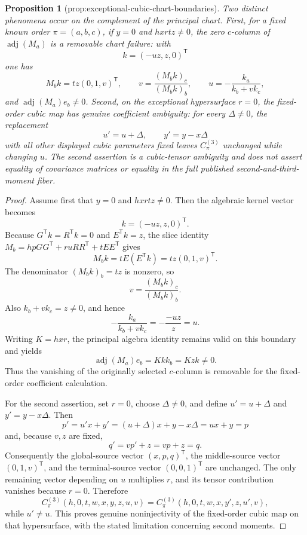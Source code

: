 \documentclass{article}
\newtheorem{proposition}{Proposition}
\begin{document}
\begin{proposition}[prop:exceptional-cubic-chart-boundaries]\label{prop:exceptional-cubic-chart-boundaries}
Two distinct phenomena occur on the complement of the principal chart.  First, for a fixed known order \(\pi=(a,b,c)\), if \(y=0\) and \(hxrtz\ne0\), the zero \(c\)-column of \(\operatorname{adj}(M_a)\) is a removable chart failure: with
\[
k=(-uz,z,0)^{\mathsf T}
\]
one has
\[
M_bk=tz(0,1,v)^{\mathsf T},
\qquad
v=\frac{(M_bk)_c}{(M_bk)_b},
\qquad
u=-\frac{k_a}{k_b+vk_c},
\]
and \(\operatorname{adj}(M_a)e_b\ne0\).  Second, on the exceptional hypersurface \(r=0\), the fixed-order cubic map has genuine coefficient ambiguity: for every \(\Delta\ne0\), the replacement
\[
u'=u+\Delta,
\qquad
y'=y-x\Delta
\]
with all other displayed cubic parameters fixed leaves \(C_{\pi}^{(3)}\) unchanged while changing \(u\).  The second assertion is a cubic-tensor ambiguity and does not assert equality of covariance matrices or equality in the full published second-and-third-moment fiber.
\end{proposition}
\begin{proof}
Assume first that \(y=0\) and \(hxrtz\ne0\).  Then the algebraic kernel vector becomes
\[
k=(-uz,z,0)^{\mathsf T}.
\]
Because \(G^{\mathsf T}k=R^{\mathsf T}k=0\) and \(E^{\mathsf T}k=z\), the slice identity
\(M_b=hpGG^{\mathsf T}+ruRR^{\mathsf T}+tEE^{\mathsf T}\) gives
\[
M_bk=tE(E^{\mathsf T}k)=tz(0,1,v)^{\mathsf T}.
\]
The denominator \((M_bk)_b=tz\) is nonzero, so
\[
v=\frac{(M_bk)_c}{(M_bk)_b}.
\]
Also \(k_b+vk_c=z\ne0\), and hence
\[
-\frac{k_a}{k_b+vk_c}=-\frac{-uz}{z}=u.
\]
Writing \(K=hxr\), the principal algebra identity remains valid on this boundary and yields
\[
\operatorname{adj}(M_a)e_b=Kk k_b=Kzk\ne0.
\]
Thus the vanishing of the originally selected \(c\)-column is removable for the fixed-order coefficient calculation.

For the second assertion, set \(r=0\), choose \(\Delta\ne0\), and define \(u'=u+\Delta\) and \(y'=y-x\Delta\).  Then
\[
p'=u'x+y'=(u+\Delta)x+y-x\Delta=ux+y=p
\]
and, because \(v,z\) are fixed,
\[
q'=vp'+z=vp+z=q.
\]
Consequently the global-source vector \((x,p,q)^{\mathsf T}\), the middle-source vector \((0,1,v)^{\mathsf T}\), and the terminal-source vector \((0,0,1)^{\mathsf T}\) are unchanged.  The only remaining vector depending on \(u\) multiplies \(r\), and its tensor contribution vanishes because \(r=0\).  Therefore
\[
C_{\pi}^{(3)}(h,0,t,w,x,y,z,u,v)
=C_{\pi}^{(3)}(h,0,t,w,x,y',z,u',v),
\]
while \(u'\ne u\).  This proves genuine noninjectivity of the fixed-order cubic map on that hypersurface, with the stated limitation concerning second moments.
\end{proof}
\end{document}

